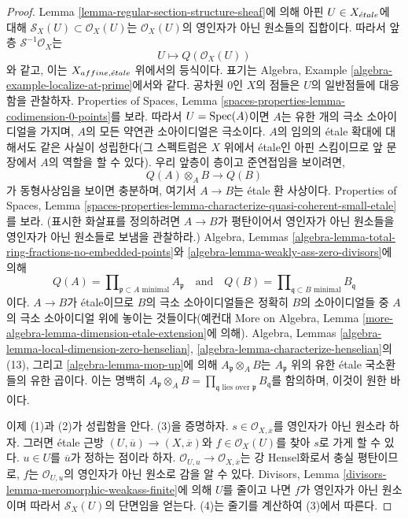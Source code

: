 \begin{proof}
Lemma \ref{lemma-regular-section-structure-sheaf}에 의해
아핀 $U \in X_{\acute{e}tale}$에 대해
$\mathcal{S}_X(U) \subset \mathcal{O}_X(U)$는
$\mathcal{O}_X(U)$의 영인자가 아닌 원소들의 집합이다. 따라서 앞층
$\mathcal{S}^{-1}\mathcal{O}_X$는
$$
U \longmapsto Q(\mathcal{O}_X(U))
$$
와 같고, 이는 $X_{affine, {\acute{e}tale}}$ 위에서의 등식이다. 표기는 Algebra, Example
\ref{algebra-example-localize-at-prime}에서와 같다. 공차원 $0$인 $X$의
점들은 $U$의 일반점들에 대응함을 관찰하자. Properties of Spaces, Lemma
\ref{spaces-properties-lemma-codimension-0-points}를 보라. 따라서
$U = \mathop{\mathrm{Spec}}(A)$이면 $A$는 유한 개의 극소 소아이디얼을 가지며, $A$의
모든 약연관 소아이디얼은 극소이다. $A$의 임의의 \'etale 확대에 대해서도
같은 사실이 성립한다(그 스펙트럼은 $X$ 위에서 \'etale인 아핀 스킴이므로
앞 문장에서 $A$의 역할을 할 수 있다). 우리 앞층이 층이고 준연접임을
보이려면,
$$
Q(A) \otimes_A B \longrightarrow Q(B)
$$
가 동형사상임을 보이면 충분하며, 여기서 $A \to B$는 \'etale 환
사상이다. Properties of Spaces, Lemma
\ref{spaces-properties-lemma-characterize-quasi-coherent-small-etale}를
보라. (표시한 화살표를 정의하려면 $A \to B$가 평탄이어서 영인자가 아닌
원소들을 영인자가 아닌 원소들로 보냄을 관찰하라.)
Algebra, Lemmas
\ref{algebra-lemma-total-ring-fractions-no-embedded-points}와
\ref{algebra-lemma-weakly-ass-zero-divisors}에 의해
$$
Q(A) = \prod\nolimits_{\mathfrak p \subset A\text{ minimal}} A_\mathfrak p
\quad\text{and}\quad
Q(B) = \prod\nolimits_{\mathfrak q \subset B\text{ minimal}} B_\mathfrak q
$$
이다. $A \to B$가 \'etale이므로 $B$의 극소 소아이디얼들은 정확히
$B$의 소아이디얼들 중 $A$의 극소 소아이디얼 위에 놓이는 것들이다(예컨대 More on
Algebra, Lemma \ref{more-algebra-lemma-dimension-etale-extension}에 의해).
Algebra, Lemmas \ref{algebra-lemma-local-dimension-zero-henselian},
\ref{algebra-lemma-characterize-henselian}의 (13), 그리고
\ref{algebra-lemma-mop-up}에 의해
$A_\mathfrak p \otimes_A B$는 $A_\mathfrak p$ 위의 유한 \'etale 국소환들의
유한 곱이다. 이는 명백히
$A_\mathfrak p \otimes_A B =
\prod_{\mathfrak q\text{ lies over }\mathfrak p} B_\mathfrak q$를
함의하며, 이것이 원한 바이다.

\medskip\noindent
이제 (1)과 (2)가 성립함을 안다. (3)을 증명하자.
$s \in \mathcal{O}_{X, \overline{x}}$를 영인자가 아닌 원소라 하자. 그러면
\'etale 근방 $(U, \overline{u}) \to (X, \overline{x})$와
$f \in \mathcal{O}_X(U)$를 찾아 $s$로 가게 할 수 있다. $u \in U$를
$\overline{u}$가 정하는 점이라 하자. $\mathcal{O}_{U, u} \to
\mathcal{O}_{X, \overline{x}}$는 강 Hensel화로서 충실 평탄이므로, $f$는
$\mathcal{O}_{U, u}$의 영인자가 아닌 원소로 감을 알 수 있다. Divisors,
Lemma \ref{divisors-lemma-meromorphic-weakass-finite}에 의해 $U$를
줄이고 나면 $f$가 영인자가 아닌 원소이며 따라서
$\mathcal{S}_X(U)$의 단면임을 얻는다. (4)는 줄기를 계산하여 (3)에서 따른다.
\end{proof}

